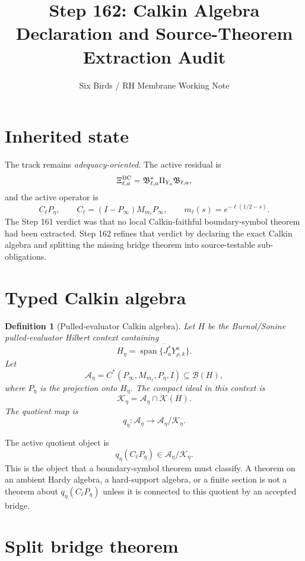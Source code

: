\documentclass[11pt]{article}
\title{Step 162: Calkin Algebra Declaration and Source-Theorem Extraction Audit}
\author{Six Birds / RH Membrane Working Note}
\date{}
\newtheorem{definition}{Definition}
\begin{document}
\maketitle

\section{Inherited state}

The track remains \emph{adequacy-oriented}.  The active residual is
\[
  \Xi^{\rm BC}_{\ell,a}
  =
  \mathfrak B_{\ell,a}^{*}\Pi_{Y_a}\mathfrak B_{\ell,a},
\]
and the active operator is
\[
  C_\ell P_\eta,
  \qquad
  C_\ell=(I-P_\infty)M_{m_\ell}P_\infty,
  \qquad
  m_\ell(s)=e^{-\ell(1/2-s)}.
\]
The Step 161 verdict was that no local Calkin-faithful boundary-symbol theorem
had been extracted.  Step 162 refines that verdict by declaring the exact
Calkin algebra and splitting the missing bridge theorem into source-testable
sub-obligations.

\section{Typed Calkin algebra}

\begin{definition}[Pulled-evaluator Calkin algebra]
Let \(H\) be the Burnol/Sonine pulled-evaluator Hilbert context containing
\[
  H_\eta=
  \overline{\operatorname{span}\{J_a^*Y^a_{\rho,k}\}}.
\]
Let
\[
  \mathcal A_\eta
  =
  C^*(P_\infty,M_{m_\ell},P_\eta,I)
  \subseteq \mathcal B(H),
\]
where \(P_\eta\) is the projection onto \(H_\eta\).  The compact ideal in this
context is
\[
  \mathcal K_\eta=\mathcal A_\eta\cap\mathcal K(H).
\]
The quotient map is
\[
  q_\eta:\mathcal A_\eta\to\mathcal A_\eta/\mathcal K_\eta.
\]
\end{definition}

The active quotient object is
\[
  q_\eta(C_\ell P_\eta)
  \in
  \mathcal A_\eta/\mathcal K_\eta.
\]
This is the object that a boundary-symbol theorem must classify.  A theorem on
an ambient Hardy algebra, a hard-support algebra, or a finite section is not a
theorem about \(q_\eta(C_\ell P_\eta)\) unless it is connected to this quotient
by an accepted bridge.

\section{Split bridge theorem}
\end{document}

